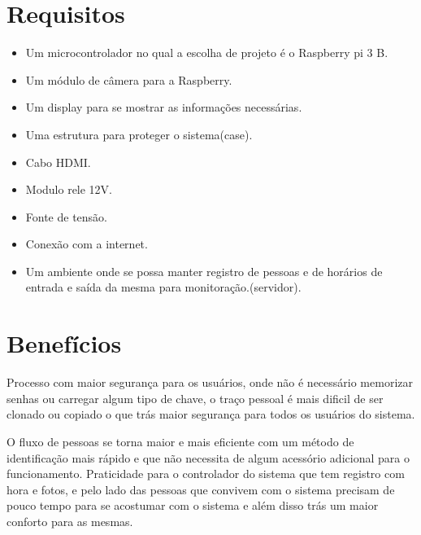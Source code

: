 \documentclass[conference,compsoc]{IEEEtran}
\begin{document}
\section{Requisitos}
\begin{itemize}
   \item Um microcontrolador no qual a escolha de projeto é o Raspberry pi 3 B. 
   \item Um módulo de câmera para a Raspberry.
   \item Um display para se mostrar as informações necessárias.
   \item Uma estrutura para proteger o sistema(case).
   \item Cabo HDMI.
   \item Modulo rele 12V.
   \item Fonte de tensão.
   \item Conexão com a internet.
   \item Um ambiente onde se possa manter registro de pessoas e de
horários de entrada e saída da mesma para monitoração.(servidor).
 \end{itemize}
 
\section{Benefícios}
Processo com maior segurança para os usuários, onde não é necessário  memorizar senhas ou carregar algum tipo de chave, o traço pessoal é mais dificil de ser clonado ou copiado o que trás maior segurança para todos os usuários do sistema.

O fluxo de pessoas se torna maior e mais eficiente com um método de identificação mais rápido e que não necessita de algum acessório adicional para o funcionamento. Praticidade para o controlador do sistema que tem registro com hora e fotos, e pelo lado das pessoas que convivem com o sistema precisam de pouco tempo para se acostumar com o sistema e além disso trás um maior conforto para as mesmas.


\end{document}
